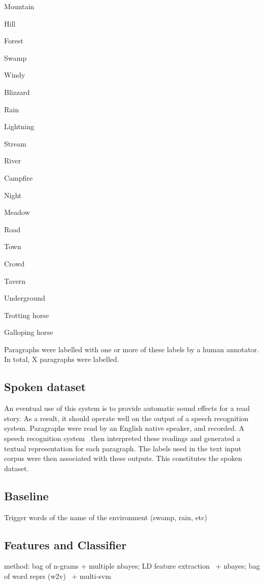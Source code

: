 \documentclass[11pt]{article}
\begin{document}
\begin{itemize*}
\item Mountain
\item Hill
\item Forest
\item Swamp
\item Windy
\item Blizzard
\item Rain
\item Lightning
\item Stream
\item River
\item Campfire
\item Night
\item Meadow
\item Road
\item Town
\item Crowd
\item Tavern
\item Underground
\item Trotting horse
\item Galloping horse
\end{itemize*}

Paragraphs were labelled with one or more of these labels by a human annotator.
In total, X paragraphs were labelled.

\subsection{Spoken dataset}
An eventual use of this system is to provide automatic sound effects for a read story.
As a result, it should operate well on the output of a speech recognition system.
Paragraphs were read by an English native speaker, and recorded.
A speech recognition system~\cite{lamere2003design} then interpreted these readings and generated a textual representation for each paragraph.
The labels used in the text input corpus were then associated with these outputs.
This constitutes the spoken dataset.

\subsection{Baseline}
Trigger words of the name of the environment (swamp, rain, etc)

\subsection{Features and Classifier}
method: bag of n-grams + multiple nbayes; LD feature extraction~\cite{lui2011cross} + nbayes; bag of word reprs (w2v)~\cite{mikolov2013efficient} + multi-svm
\end{document}
